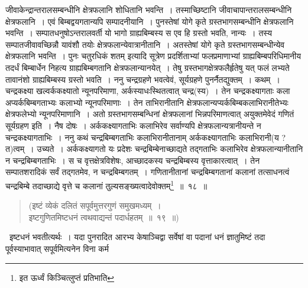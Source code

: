 \documentclass[11pt, openany]{book}
\begin{document}
\noindent जीवाकेन्द्रान्तरालसम्बन्धीनि क्षेत्रफलानि शोधितानि भवन्ति~। तस्माच्छिष्टानि जीवाचापान्तरालसम्बन्धीनि क्षेत्रफलानि~। एवं बिम्बद्वयगतान्यपि सम्पादनीयानि~। पुनस्तेषां योगे कृते ग्रस्तभागसम्बन्धीनि क्षेत्रफलानि भवन्ति~। सम्पातधनुषोऽन्तरालवर्ती यो भागो ग्राह्यबिम्बस्य स एव हि ग्रस्तो भवति, नान्यः~। तस्य सम्पातजीवावच्छिन्नौ यावंशौ तयोः क्षेत्रफलान्येवात्रानीतानि~। अतस्तेषां योगे कृते ग्रस्तभागसम्बन्धीन्येव क्षेत्रफलानि भवन्ति~। पुनः {\qt चतुरधिकं शतम्} इत्यादि सूत्रेण प्रदर्शिताभ्यां फलप्रमाणाभ्यां ग्राह्यबिम्बपरिधिमानीय तदर्धं बिम्बार्धेन निहत्य ग्राह्यबिम्बगतानि क्षेत्रफलान्यानयेत्~। तेषु ग्रस्तभागक्षेत्रफलैर्हृतेषु यत् फलं लभ्यते तावानंशो ग्राह्यबिम्बस्य ग्रस्तो भवति~। ननु चन्द्रग्रहणे भवत्वेवं, सूर्यग्रहणे पुनर्नैतद्युक्तम्~। कथम्~। चन्द्रकक्ष्या खल्वर्ककक्ष्यातो न्यूनपरिमाणा, अर्कस्याधःस्थितत्वात् चन्द्र(स्य)~। तेन चन्द्रकक्ष्यागताः कला अप्यर्कबिम्बगताभ्यः कलाभ्यो न्यूनपरिमाणाः~। तेन ताभिरानीतानि क्षेत्रफलान्यप्यर्कबिम्बकलाभिरानीतेभ्यः क्षेत्रफलेभ्यो न्यूनपरिमाणानि~। अतो ग्रस्तभागसम्बन्धिनां क्षेत्रफलानां भिन्नपरिमाणत्वात् अयुक्तमेवेदं गणितं सूर्यग्रहण इति~। नैष दोषः~। अर्ककक्ष्यागताभिः कलाभिरेव सर्वाण्यपि क्षेत्रफलान्यत्रानीयन्ते न चन्द्रकक्ष्यागताभिः~। ननु कथं चन्द्रबिम्बगताभिः कलाभिरानीतानाम् अर्ककक्ष्यागताभिः कलाभिरानी(य ? त)त्वम्~। उच्यते~। अर्ककक्ष्यागतो यः प्रदेशः चन्द्रबिम्बेनाच्छाद्यते तद्गताभिः कलाभिरेव क्षेत्रफलान्यानीतानि न चन्द्रबिम्बगताभिः~। स च वृत्तक्षेत्रविशेषः, आच्छादकस्य चन्द्रबिम्बस्य वृत्ताकारत्वात्~। तेन सम्पातशरादिकं सर्वं तद्गतमेव, न चन्द्रबिम्बगतम्~। गणितानीतानां चन्द्रबिम्बगतानां कलानां तत्साधनत्वं चन्द्रबिम्बे तदाच्छाद्ये वृत्ते च कलानां तुल्यसङ्ख्यत्वादेवोक्तम्\renewcommand{\thefootnote}{*}\footnote{इत ऊर्ध्वं किञ्चित्लुप्तं प्रतिभाति}~॥~१८~॥

\begin{quote}
{\ab (इष्टं व्येकं दलितं सपूर्वमुत्तरगुणं समुखमध्यम्~।\\
इष्टगुणितमिष्टधनं त्वथवाद्यन्तं पदार्धहतम्~॥~१९~॥)}
\end{quote}

\dotfill\ इष्टधनं भवतीत्यर्थः~। यदा पुनरादित आरभ्य केषाञ्चिद्वा सर्वेषां वा पदानां धनं ज्ञातुमिष्टं तदा पूर्वस्याभावात् सपूर्वमित्यनेन विना कर्म

\newpage
\end{document}
